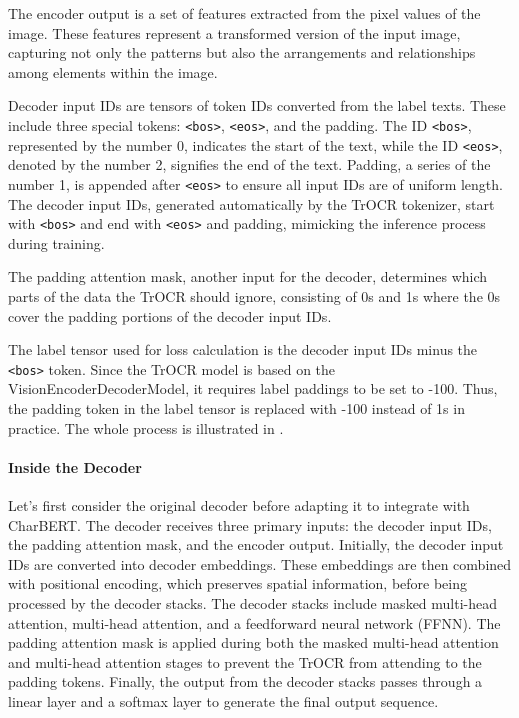 The encoder output is a set of features extracted from the pixel values of the image. These features represent a transformed version of the input image, capturing not only the patterns but also the arrangements and relationships among elements within the image.

Decoder input IDs are tensors of token IDs converted from the label texts. These include three special tokens: \texttt{<bos>}, \texttt{<eos>}, and the padding. The ID \texttt{<bos>}, represented by the number 0, indicates the start of the text, while the ID \texttt{<eos>}, denoted by the number 2, signifies the end of the text. Padding, a series of the number 1, is appended after \texttt{<eos>} to ensure all input IDs are of uniform length. The decoder input IDs, generated automatically by the TrOCR tokenizer, start with \texttt{<bos>} and end with \texttt{<eos>} and padding, mimicking the inference process during training. 

The padding attention mask, another input for the decoder, determines which parts of the data the TrOCR should ignore, consisting of 0s and 1s where the 0s cover the padding portions of the decoder input IDs.

The label tensor used for loss calculation is the decoder input IDs minus the \texttt{<bos>} token. Since the TrOCR model is based on the VisionEncoderDecoderModel, it requires label paddings to be set to -100. Thus, the padding token in the label tensor is replaced with -100 instead of 1s in practice. The whole process is illustrated in .


\paragraph*{Inside the Decoder}
\label{par:3_inside_the_decoder}
Let's first consider the original decoder before adapting it to integrate with CharBERT. The decoder receives three primary inputs: the decoder input IDs, the padding attention mask, and the encoder output. Initially, the decoder input IDs are converted into decoder embeddings. These embeddings are then combined with positional encoding, which preserves spatial information, before being processed by the decoder stacks. The decoder stacks include masked multi-head attention, multi-head attention, and a feedforward neural network (FFNN). The padding attention mask is applied during both the masked multi-head attention and multi-head attention stages to prevent the TrOCR from attending to the padding tokens. Finally, the output from the decoder stacks passes through a linear layer and a softmax layer to generate the final output sequence.

